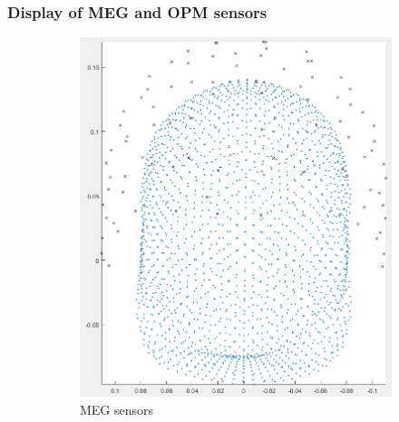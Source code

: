 \documentclass{beamer}
\numberwithin{figure}{section}
\numberwithin{equation}{section}
\begin{document}
\section{}
\begin{frame}
 \frametitle{Display of MEG and OPM sensors}
 	
 	\begin{figure}[h]
        \begin{subfigure}[h]{0.4\linewidth} 
            \includegraphics[width=\textwidth]{pictures/megsen}
            \caption{\scriptsize MEG sensors}
            \label{fig:rdf_graph}
        \end{subfigure}       
        \begin{subfigure}[h]{0.33\linewidth} 

\end{subfigure}
\end{figure}
\end{frame}
\end{document}
